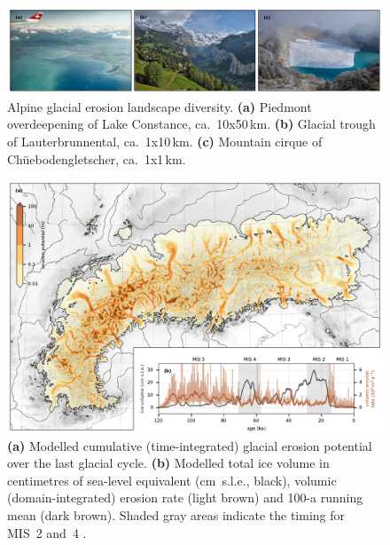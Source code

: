 \documentclass[utf8]{article}
\begin{document}





\clearpage

    \begin{figure}
      \centerline{\includegraphics{alpero_landscape}}
      \caption{%
        Alpine glacial erosion landscape diversity.
        \textbf{(a)} Piedmont overdeepening of Lake Constance, ca.~10x50\,km.
        \textbf{(b)} Glacial trough of Lauterbrunnental, ca.~1x10\,km.
        \textbf{(c)} Mountain cirque of Chüebodengletscher, ca.~1x1\,km.}
      \label{fig:landscape}
    \end{figure}

    \begin{figure}
      \centerline{\includegraphics{alpero_cumulative}}
      \caption{%
        \textbf{(a)} Modelled cumulative (time-integrated) glacial erosion
          potential over the last glacial cycle.
        \textbf{(b)} Modelled total ice volume in centimetres of sea-level
          equivalent (cm~s.l.e., black), volumic (domain-integrated) erosion
          rate (light brown) and 100-a running mean (dark brown). Shaded gray
          areas indicate the timing for MIS~2 and~4
          \citep{Lisiecki.Raymo.2005}.} \label{fig:cumulative}
    \end{figure}
\end{document}
